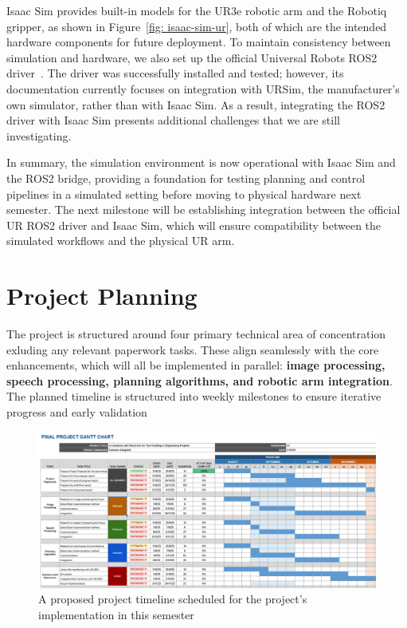 \documentclass[12pt]{extarticle}
\begin{document}
Isaac Sim provides built-in models for the UR3e robotic arm and the Robotiq gripper, as shown in Figure~\ref{fig: isaac-sim-ur}, both of which are the intended hardware components for future deployment. To maintain consistency between simulation and hardware, we also set up the official Universal Robots ROS2 driver~\cite{urarm-ros2}. The driver was successfully installed and tested; however, its documentation currently focuses on integration with URSim, the manufacturer’s own simulator, rather than with Isaac Sim. As a result, integrating the ROS2 driver with Isaac Sim presents additional challenges that we are still investigating.

In summary, the simulation environment is now operational with Isaac Sim and the ROS2 bridge, providing a foundation for testing planning and control pipelines in a simulated setting before moving to physical hardware next semester. The next milestone will be establishing integration between the official UR ROS2 driver and Isaac Sim, which will ensure compatibility between the simulated workflows and the physical UR arm.

\newpage
\section{Project Planning}
The project is structured around four primary technical area of concentration exluding any relevant paperwork tasks. These align seamlessly with the core enhancements, which will all be implemented in parallel: \textbf{image processing, speech processing, planning algorithms, and robotic arm integration}.  The planned timeline is structured into weekly milestones to ensure iterative progress and early validation 

\begin{figure}[htbp]
    \centering
    \includegraphics[width=0.8\linewidth]{images/Gantt_chart(2).png}
    \caption{A proposed project timeline scheduled for the project’s implementation in this semester}
    \label{fig:gantt-chart}
\end{figure}
\end{document}
